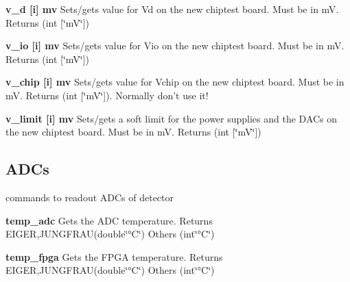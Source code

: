 \begin{DoxyItemize}
\item {\bfseries v\_\-d \mbox{[}i\mbox{]} mv} Sets/gets value for Vd on the new chiptest board. Must be in mV. {\ttfamily Returns} {\ttfamily }(int \mbox{[}\char`\"{}mV\char`\"{}\mbox{]})
\end{DoxyItemize}


\begin{DoxyItemize}
\item {\bfseries v\_\-io \mbox{[}i\mbox{]} mv} Sets/gets value for Vio on the new chiptest board. Must be in mV. {\ttfamily Returns} {\ttfamily }(int \mbox{[}\char`\"{}mV\char`\"{}\mbox{]})
\end{DoxyItemize}


\begin{DoxyItemize}
\item {\bfseries v\_\-chip \mbox{[}i\mbox{]} mv} Sets/gets value for Vchip on the new chiptest board. Must be in mV. {\ttfamily Returns} {\ttfamily }(int \mbox{[}\char`\"{}mV\char`\"{}\mbox{]}). Normally don't use it!
\end{DoxyItemize}


\begin{DoxyItemize}
\item {\bfseries v\_\-limit \mbox{[}i\mbox{]} mv} Sets/gets a soft limit for the power supplies and the DACs on the new chiptest board. Must be in mV. {\ttfamily Returns} {\ttfamily }(int \mbox{[}\char`\"{}mV\char`\"{}\mbox{]})
\end{DoxyItemize}\hypertarget{settings_settingsadcs}{}\subsection{ADCs}\label{settings_settingsadcs}
commands to readout ADCs of detector


\begin{DoxyItemize}
\item {\bfseries temp\_\-adc} Gets the ADC temperature. {\ttfamily Returns} {\ttfamily EIGER},JUNGFRAU(double\char`\"{}°C\char`\"{}) Others {\ttfamily }(int\char`\"{}°C\char`\"{})
\end{DoxyItemize}


\begin{DoxyItemize}
\item {\bfseries temp\_\-fpga} Gets the FPGA temperature. {\ttfamily Returns} {\ttfamily EIGER},JUNGFRAU(double\char`\"{}°C\char`\"{}) Others {\ttfamily }(int\char`\"{}°C\char`\"{})
\end{DoxyItemize}


